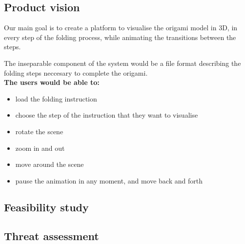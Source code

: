 \documentclass[english,12pt]{aghthesis}
\begin{document}
\begin{figure}
\end{figure}

\subsection{Product vision}

Our main goal is to create a platform to visualise the origami model in 3D,
in every step of the folding process, while animating the transitions between the steps.

The inseparable component of the system would be a file format describing the folding steps neccesary to complete the origami.\\

\noindent \textbf{The users would be able to:}
\begin{itemize}
	\item load the folding instruction
	\item choose the step of the instruction that they want to visualise
	\item rotate the scene
    \item zoom in and out
	\item move around the scene
	\item pause the animation in any moment, and move back and forth
\end{itemize}


\subsection{Feasibility study}
\subsection{Threat assessment}
\end{document}
